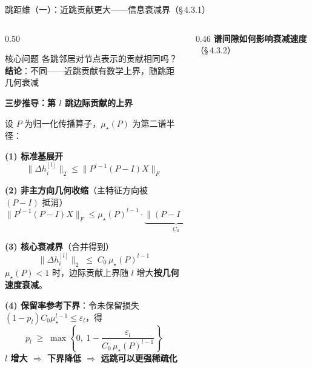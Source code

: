 \documentclass[aspectratio=169,9pt,xcolor=dvipsnames]{beamer}
\newcommand{\highlight}[1]{\textcolor{myred}{\textbf{#1}}}
\newcommand{\blue}[1]{\textcolor{mynavy}{#1}}
\begin{document}
\begin{frame}{跳距维（一）：近跳贡献更大——信息衰减界（§\,4.3.1）}
\begin{columns}[T]

\begin{column}{0.50\textwidth}
  \begin{alertblock}{核心问题}
    \small 各跳邻居对节点表示的贡献相同吗？\\
    \textbf{结论}：不同——近跳贡献有数学上界，随跳距几何衰减
  \end{alertblock}

  \vspace{0.05cm}
  {\small
  \textbf{\blue{三步推导：第 $l$ 跳边际贡献的上界}}

  设 $P$ 为归一化传播算子，$\mu_\star(P)$ 为第二谱半径：

  \textbf{(1) 标准基展开}
  \begin{equation*}
    \|\Delta h_i^{[l]}\|_2 \le \|P^{l-1}(P-I)X\|_F
  \end{equation*}

  \textbf{(2) 非主方向几何收缩}（主特征方向被 $(P-I)$ 抵消）
  \begin{equation*}
    \|P^{l-1}(P-I)X\|_F \le \mu_\star(P)^{l-1} \cdot \underbrace{\|(P-I)X\|_F}_{C_0}
  \end{equation*}

  \vspace{-0.3cm}

  \textbf{(3) 核心衰减界}（合并得到）
  \begin{equation*}
    \boxed{\|\Delta h_i^{[l]}\|_2 \;\le\; C_0\,\mu_\star(P)^{l-1}}
  \end{equation*}
  $\mu_\star(P)<1$ 时，边际贡献上界随 $l$ 增大\textbf{按几何速度衰减}。

  \vspace{0.1cm}
  \textbf{(4) 保留率参考下界}：令未保留损失 $(1-p_l)C_0\mu_\star^{l-1}\le\varepsilon_l$，得
  \begin{equation*}
    p_l \;\geq\; \max\!\left\{0,\;1 - \frac{\varepsilon_l}{C_0\,\mu_\star(P)^{l-1}}\right\}
  \end{equation*}
  \highlight{$l$ 增大 $\Rightarrow$ 下界降低 $\Rightarrow$ 远跳可以更强稀疏化}
  }
\end{column}

\begin{column}{0.46\textwidth}
  \textbf{\blue{谱间隙如何影响衰减速度}}（§\,4.3.2）


\end{column}
\end{columns}
\end{frame}
\end{document}
